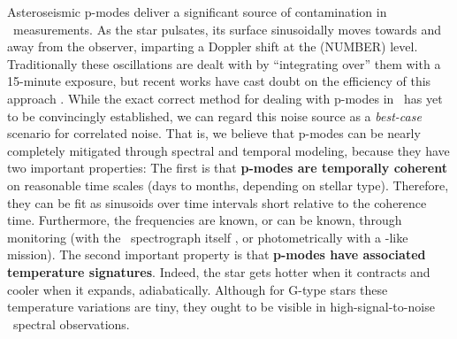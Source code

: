 \documentclass[12pt, letterpaper]{article}
\begin{document}
Asteroseismic p-modes deliver a significant source of contamination in \EPRV\
measurements. 
As the star pulsates, its surface sinusoidally moves towards and away from
the observer, imparting a Doppler shift at the (NUMBER) level.
Traditionally these oscillations are dealt with by ``integrating over'' them
with a 15-minute exposure, but recent works have cast doubt on the efficiency 
of this approach \citep{Medina2018, Chaplin2019}. 
While the exact correct method for dealing with p-modes in \EPRV\ has yet 
to be convincingly established, we can regard this noise source as a 
\textit{best-case} scenario for correlated noise. That is, we believe that 
p-modes can be nearly completely mitigated through spectral and temporal modeling, 
because they have two important properties:
The first is that
\textbf{p-modes are temporally coherent} on reasonable time scales (days to months, depending on
stellar type). Therefore, they can be fit as sinusoids over time intervals 
short relative to the coherence time. Furthermore, the frequencies are known,
or can be known, through monitoring (with the \EPRV\ spectrograph itself 
\citep[][and references therein]{Bouchy2003},
or photometrically with a \TESS-like mission).
The second important property is that
\textbf{p-modes have associated temperature signatures}. Indeed, the star gets
hotter when it contracts and cooler when it expands, adiabatically. Although for
G-type stars these temperature variations are tiny, they ought to be visible in
high-signal-to-noise \EPRV\ spectral observations.
\end{document}
